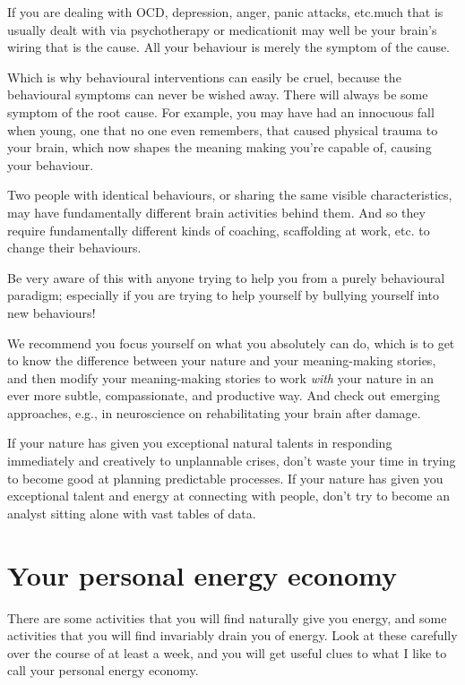 If you are dealing with OCD, depression, anger, panic attacks, etc.\textemdash much that is usually dealt with via psychotherapy or medication\textemdash it may well be your brain’s wiring that is the cause. All your behaviour is merely the symptom of the cause. 


Which is why behavioural interventions can easily be cruel, because the behavioural symptoms can never be wished away. There will always be some symptom of the root cause. For example, you may have had an innocuous fall when young, one that no one even remembers, that caused physical trauma to your brain, which now shapes the meaning making you’re capable of, causing your behaviour.


Two people with identical behaviours, or sharing the same visible characteristics, may have fundamentally different brain activities behind them. And so they require fundamentally different kinds of coaching, scaffolding at work, etc. to change their behaviours.


Be very aware of this with anyone trying to help you from a purely behavioural paradigm; especially if you are trying to help yourself by bullying yourself into new behaviours! 


We recommend you focus yourself on what you absolutely can do, which is to get to know the difference between your nature and your meaning\hyp{}making stories, and then modify your meaning\hyp{}making stories to work \emph{with} your nature in an ever more subtle, compassionate, and productive way. And check out emerging approaches, e.g., in neuroscience on rehabilitating your brain after damage.


If your nature has given you exceptional natural talents in responding immediately and creatively to unplannable crises, don't waste your time in trying to become good at planning predictable processes. If your nature  has given you exceptional talent and energy at connecting with people, don't try to become an analyst sitting alone with vast tables of data.
\section{Your personal energy economy}
\label{section:PEE} 
There are some activities that you will find naturally give you energy,  and some activities that you will find invariably drain you of energy. Look at these carefully over the course of at least a week, and you will get useful clues to what I like to call your personal energy economy.



